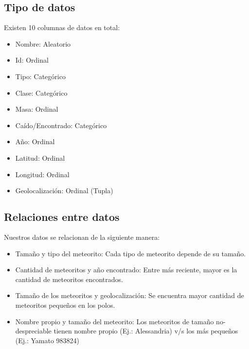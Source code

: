 \documentclass[letterpaper,10pt]{article}
\begin{document}
	\subsection{Tipo de datos}

	Existen 10 columnas de datos en total:

	\begin{itemize}
		\item Nombre: Aleatorio
		\item Id: Ordinal
		\item Tipo: Categórico
		\item Clase: Categórico
		\item Masa: Ordinal

		\item Caído/Encontrado: Categórico
		\item Año: Ordinal
		\item Latitud: Ordinal
		\item Longitud: Ordinal
		\item Geolocalización: Ordinal (Tupla)
	\end{itemize}

	\subsection{Relaciones entre datos}

	Nuestros datos se relacionan de la siguiente manera:

	\begin{itemize}
		\item Tamaño y tipo del meteorito: Cada tipo de meteorito depende de su tamaño.
		\item Cantidad de meteoritos y año encontrado: Entre más reciente, mayor es la cantidad de meteoritos encontrados.
		\item Tamaño de los meteoritos y geolocalización: Se encuentra mayor cantidad de meteoritos pequeños en los polos.
		\item Nombre propio y tamaño del meteorito: Los meteoritos de tamaño no-despreciable tienen nombre propio (Ej.: Alessandria) v/s los más pequeños (Ej.: Yamato 983824)
	\end{itemize}

	\newpage
\end{document}
